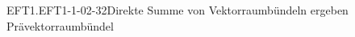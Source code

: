 \begin{KORO}{EFT1.EFT1-1-02-32}{Direkte Summe von Vektorraumbündeln ergeben Prävektorraumbündel}

\end{KORO}
